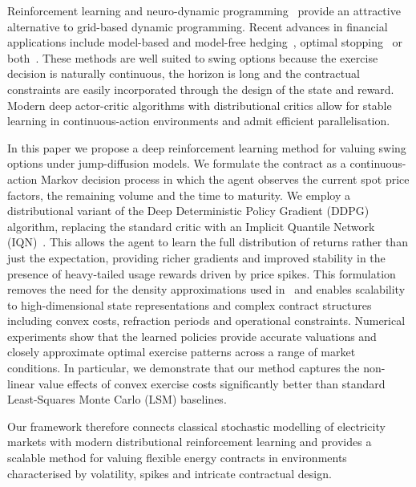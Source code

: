 \documentclass[a4paper,fleqn]{cas-dc}
\newcommand{\sven}[1]{\textcolor{red}{[Sven: #1]}}
\begin{document}
Reinforcement learning and neuro-dynamic programming~\cite{bertsekas1996neuro,sutton1998reinforcement} provide an attractive alternative to grid-based dynamic programming. Recent advances in financial applications include model-based and model-free hedging~\cite{halperin2017qlbs,buehler2019deephedging}, optimal stopping~\cite{becker2019deepoptimalstopping} or both~\cite{tsoskounoglou2025higherorder}. These methods are well suited to swing options because the exercise decision is naturally continuous, the horizon is long and the contractual constraints are easily incorporated through the design of the state and reward. Modern deep actor-critic algorithms with distributional critics allow for stable learning in continuous-action environments and admit efficient parallelisation.

In this paper we propose a deep reinforcement learning method for valuing swing options under jump-diffusion models. We formulate the contract as a continuous-action Markov decision process in which the agent observes the current spot price factors, the remaining volume and the time to maturity. 
We employ a distributional variant of the Deep Deterministic Policy Gradient (DDPG) algorithm, replacing the standard critic with an Implicit Quantile Network (IQN)~\cite{dabney2018implicit}. This allows the agent to learn the full distribution of returns rather than just the expectation, providing richer gradients and improved stability in the presence of heavy-tailed usage rewards driven by price spikes.
This formulation removes the need for the density approximations used in~\cite{Hambly2009} and enables scalability to high-dimensional state representations and complex contract structures including convex costs, refraction periods and operational constraints. Numerical experiments show that the learned policies provide accurate valuations and closely approximate optimal exercise patterns across a range of market conditions. In particular, we demonstrate that our method captures the non-linear value effects of convex exercise costs significantly better than standard Least-Squares Monte Carlo (LSM) baselines.


Our framework therefore connects classical stochastic modelling of electricity markets with modern distributional reinforcement learning and provides a scalable method for valuing flexible energy contracts in environments characterised by volatility, spikes and intricate contractual design.
\end{document}
